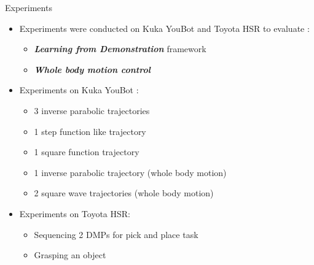 \documentclass{beamer}
\begin{document}
	\begin{frame}{Experiments}
		\begin{itemize}
			\item Experiments were conducted on Kuka YouBot and Toyota HSR to evaluate :
			\begin{itemize}
				\item \textbf{\textit{Learning from Demonstration}} framework
				\item \textbf{\textit{Whole body motion control}}
			\end{itemize}  
			\item Experiments on Kuka YouBot :
			\begin{itemize}
				\item 3 inverse parabolic trajectories 
				\item 1 step function like trajectory 
				\item 1 square function trajectory 
				\item 1 inverse parabolic trajectory (whole body motion)
				\item 2 square wave trajectories (whole body motion)
			\end{itemize}
			\item Experiments on Toyota HSR:
			\begin{itemize}
				\item Sequencing 2 DMPs for pick and place task
				\item Grasping an object
			\end{itemize}
		\end{itemize}
	\end{frame}
	
\end{document}
